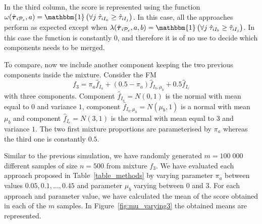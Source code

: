 \documentclass[10pt, a4paper]{article}
\newcommand{\m}[1]{\boldsymbol{#1}}
\begin{document}
\begin{spacing}{1.9}
In the third column, the score is represented using the function $\omega(\hat{\m \tau}_{i \mathcal{P}_s}, a) = \mathbbm{1}\left( \forall j\; \hat{\tau}_{i I_{a}} \geq \hat{\tau}_{iI_j} \right)$. In this case, all the approaches perform as expected except when $\lambda(\hat{\m \tau}_{i \mathcal{P}_s}, a, b) = \mathbbm{1}\left( \forall j\; \hat{\tau}_{i I_{b}} \geq \hat{\tau}_{iI_j} \right)$. In this case the function is constantly $0$, and therefore it is of no use to decide which components needs to be merged.


To compare, now we include another component keeping the two previous components inside the mixture. Consider the FM
\begin{equation}\label{three_mixture}
f_3 = \pi_a \hat{f}_{I_a} + (0.5 - \pi_a) \hat{f}_{I_b, \mu_b} + 0.5 \hat{f}_{I_c}
\end{equation}
with three components. Component $\hat{f}_{I_a} = N(0, 1)$ is the normal with mean equal to $0$ and variance $1$, component $\hat{f}_{I_b, \mu_b} = N(\mu_b, 1)$ is a normal with mean $\mu_b$ and component $\hat{f}_{I_c} = N(3, 1)$ is the normal with mean equal to $3$ and variance $1$. The two first mixture proportions are parameterised by $\pi_a$ whereas the third one is constantly $0.5$.

Similar to the previous simulation, we have  randomly generated $m=100\;000$ different samples of size $n=500$ from mixture $f_3$. We have evaluated each approach proposed in Table~\ref{table_methods} by varying parameter $\pi_a$ between values $0.05, 0.1, \dots, 0.45$ and parameter $\mu_b$ varying between $0$ and $3$. For each approach and parameter value, we have calculated the mean of the score obtained in each of the $m$ samples. In Figure~\ref{fig:mu_varying3} the obtained means are represented.


\end{spacing}
\end{document}
